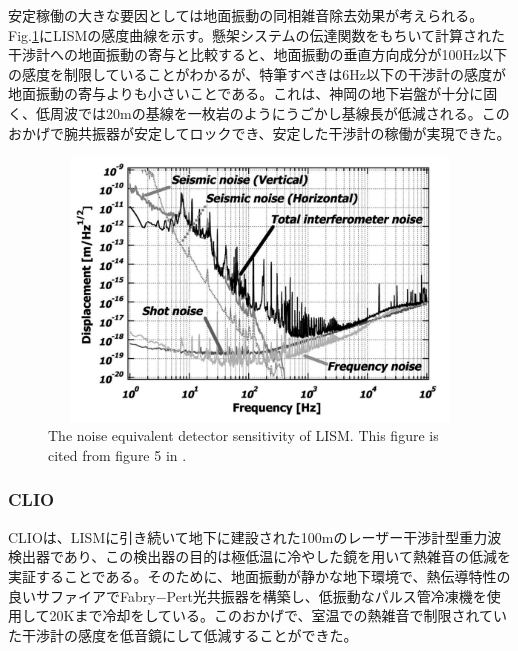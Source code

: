 安定稼働の大きな要因としては地面振動の同相雑音除去効果が考えられる。Fig.\ref{img:img122}にLISMの感度曲線を示す。懸架システムの伝達関数をもちいて計算された干渉計への地面振動の寄与と比較すると、地面振動の垂直方向成分が100Hz以下の感度を制限していることがわかるが、特筆すべきは6Hz以下の干渉計の感度が地面振動の寄与よりも小さいことである。これは、神岡の地下岩盤が十分に固く、低周波では20mの基線を一枚岩のようにうごかし基線長が低減される。このおかげで腕共振器が安定してロックでき、安定した干渉計の稼働が実現できた。
\begin{figure}[h]
  \begin{center}   
    \includegraphics[width=12cm,height=7cm]{./img_chap1/img122.png}
    \caption{The noise equivalent detector sensitivity of LISM. This figure is cited from figure 5 in \cite{sato2004ultrastable}. } \label{img:img122}
  \end{center}
\end{figure}

\subsubsection{CLIO}
CLIOは、LISMに引き続いて地下に建設された100mのレーザー干渉計型重力波検出器であり、この検出器の目的は極低温に冷やした鏡を用いて熱雑音の低減を実証することである\cite{ohashi2003design}。そのために、地面振動が静かな地下環境で、熱伝導特性の良いサファイアでFabry−Pert光共振器を構築し、低振動なパルス管冷凍機\cite{tomaru2004development}を使用して20Kまで冷却をしている。このおかげで、室温での熱雑音で制限されていた干渉計の感度を低音鏡にして低減することができた\cite{uchiyama2012reduction}。

